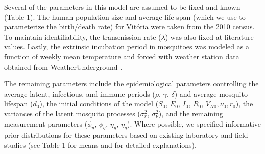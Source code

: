 \documentclass[10pt,letterpaper]{article}
\begin{document}
Several of the parameters in this model are assumed to be fixed and known (Table 1).
The human population size and average life span (which we use to parameterize the birth/death rate) for Vit\'oria were taken from the 2010 census.
To maintain identifiability, the transmission rate ($\lambda$) was also fixed at literature values.
Lastly, the extrinsic incubation period in mosquitoes was modeled as a function of weekly mean temperature and forced with weather station data obtained from WeatherUnderground \cite{weather}.

The remaining parameters include the epidemiological parameters controlling the average latent, infectious, and immune periods ($\rho$, $\gamma$, $\delta$) and average mosquito lifespan ($d_0$), the initial conditions of the model ($S_0$, $E_0$, $I_0$, $R_0$, $V_{N0}, \nu_0, r_0$), the variances of the latent mosquito processes ($\sigma^2_r$, $\sigma^2_{\nu}$), and the remaining measurement parameters ($\phi_y$, $\phi_q$, $\eta_y$, $\eta_q$).  
Where possible, we specified informative prior distributions for these parameters based on existing laboratory and field studies (see Table 1 for means and  for detailed explanations).
\end{document}
